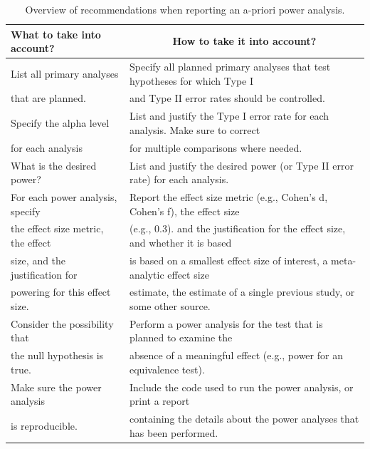 \documentclass[
  english,
  ,jou,floatsintext]{apa6}
\begin{document}
\begin{table}[tbp]

\begin{center}
\begin{threeparttable}

\caption{\label{tab:table-pow-rec-2}Overview of recommendations when reporting an a-priori power analysis.}

\begin{tabular}{ll}
\toprule
What to take into account? & \multicolumn{1}{c}{How to take it into account?}\\
\midrule
List all primary analyses & Specify all planned primary analyses that test hypotheses for which Type I\\
that are planned. & and Type II error rates should be controlled.\\ \midrule
Specify the alpha level & List and justify the Type I error rate for each analysis. Make sure to correct\\
for each analysis & for multiple comparisons where needed.\\ \midrule
What is the desired power? & List and justify the desired power (or Type II error rate) for each analysis.\\ \midrule
For each power analysis, specify & Report the effect size metric (e.g., Cohen's d, Cohen's f), the effect size\\
the effect size metric, the effect & (e.g., 0.3). and the justification for the effect size, and whether it is based\\
size, and the justification for & is based on a smallest effect size of interest, a meta-analytic effect size\\
powering for this effect size. & estimate, the estimate of a single previous study, or some other source.\\ \midrule
Consider the possibility that & Perform a power analysis for the test that is planned to examine the\\
the null hypothesis is true. & absence of a meaningful effect (e.g., power for an equivalence test).\\ \midrule
Make sure the power analysis & Include the code used to run the power analysis, or print a report\\
is reproducible. & containing the details about the power analyses that has been performed.\\
\bottomrule
\end{tabular}

\end{threeparttable}
\end{center}

\end{table}
\end{document}

